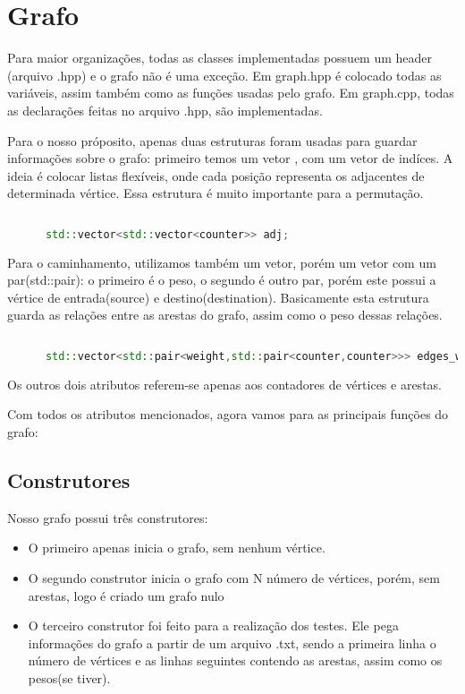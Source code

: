 \documentclass[12pt]{article}
\begin{document}
  \section{Grafo} \label{sec:graph}

    Para maior organizações, todas as classes implementadas possuem um header (arquivo .hpp)
    e o grafo não é uma exceção. Em graph.hpp é colocado todas as variáveis, assim também como as 
    funções usadas pelo grafo. Em graph.cpp, todas as declarações feitas no arquivo .hpp, são 
    implementadas.
    
    Para o nosso próposito, apenas duas estruturas foram usadas para guardar informações sobre
    o grafo: primeiro temos um vetor , com um vetor de indíces. A ideia é colocar listas flexíveis,
    onde cada posição representa os adjacentes de determinada vértice. Essa estrutura é muito
    importante para a permutação. 

    \begin{lstlisting}[language=c++]
      
      std::vector<std::vector<counter>> adj;
    \end{lstlisting}

    Para o caminhamento, utilizamos também um vetor, porém um vetor com um par(std::pair): 
    o primeiro é o peso, o segundo é outro par, porém este possui a vértice de entrada(source)
    e destino(destination). Basicamente esta estrutura guarda as relações entre as arestas 
    do grafo, assim como o peso dessas relações.

    \begin{lstlisting}[language=c++]
      
      std::vector<std::pair<weight,std::pair<counter,counter>>> edges_weights;
    \end{lstlisting}

    Os outros dois atributos referem-se apenas aos contadores de vértices e arestas.

    Com todos os atributos mencionados, agora vamos para as principais funções do grafo:

  \subsection{Construtores} \label{ssec:constructors}

    Nosso grafo possui três construtores:

    \begin{itemize}
      \item O primeiro apenas inicia o grafo, sem nenhum vértice. 
      \item O segundo construtor inicia o grafo com N número de vértices, porém, sem arestas,
      logo é criado um grafo nulo
      \item O terceiro construtor foi feito para a realização dos testes. Ele pega informações do
      grafo a partir de um arquivo .txt, sendo a primeira linha o número de vértices e as linhas 
      seguintes contendo as arestas, assim como os pesos(se tiver).
    \end{itemize}
\end{document}
